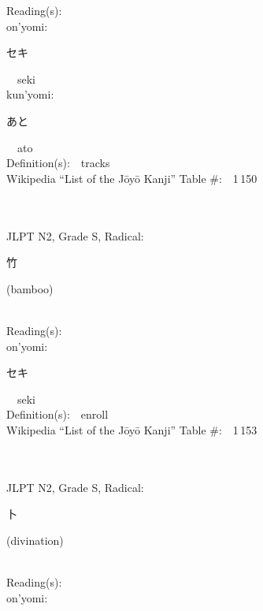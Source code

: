 \begin{multicols}{2}
Reading(s):\ \ \\
{\hspace*{1em}}on'yomi:\ \ \\
{\hspace*{2em}}{\begin{CJK}{UTF8}{min} セキ \end{CJK}}\ \ seki\ \ \\
{\hspace*{1em}}kun'yomi:\ \ \\
{\hspace*{2em}}{\begin{CJK}{UTF8}{min} あと \end{CJK}}\ \ ato\ \ \\
Definition(s):\ \ tracks \\
Wikipedia ``List of the J\=oy\=o Kanji'' Table \#:\ \ 1\,150 \\
\ \ \\
{\fontsize{34pt}{40pt}  }\ \ \\  %
{JLPT N2, Grade S, Radical:\ \ {\begin{CJK}{UTF8}{min} 竹 \end{CJK}} (bamboo) } \\
Reading(s):\ \ \\
{\hspace*{1em}}on'yomi:\ \ \\
{\hspace*{2em}}{\begin{CJK}{UTF8}{min} セキ \end{CJK}}\ \ seki\ \ \\
Definition(s):\ \ enroll \\
Wikipedia ``List of the J\=oy\=o Kanji'' Table \#:\ \ 1\,153 \\
\ \ \\
{\fontsize{34pt}{40pt}  }\ \ \\  %
{JLPT N2, Grade S, Radical:\ \ {\begin{CJK}{UTF8}{min} 卜 \end{CJK}} (divination) } \\
Reading(s):\ \ \\
{\hspace*{1em}}on'yomi:\ \ \\

\end{multicols}
